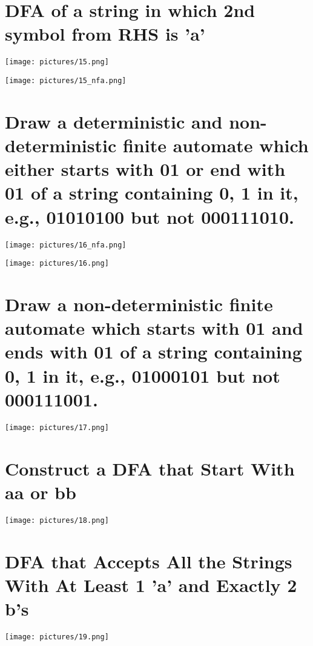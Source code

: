 \documentclass[8pt]{article}
\begin{document}
\section{DFA of a string in which 2nd symbol from RHS is 'a'}
\begin{center}
    \texttt{[image: pictures/15.png]} %
\end{center}
\begin{center}
    \texttt{[image: pictures/15\_nfa.png]} %
\end{center}
\section{Draw a deterministic and non-deterministic finite automate which either starts with 01 or end with 01 of a string containing 0, 1 in it, e.g., 01010100 but not 000111010. }
\begin{center}
    \texttt{[image: pictures/16\_nfa.png]} %
\end{center}
\begin{center}
    \texttt{[image: pictures/16.png]} %
\end{center}
\section{ Draw a non-deterministic finite automate which starts with 01 and ends with 01 of a string containing 0, 1 in it, e.g., 01000101 but not 000111001.}
\begin{center}
    \texttt{[image: pictures/17.png]} %
\end{center}
\section{Construct a DFA that Start With aa or bb}
\begin{center}
    \texttt{[image: pictures/18.png]} %
\end{center}
\section{DFA that Accepts All the Strings With At Least 1 'a' and Exactly 2 b's}
\begin{center}
    \texttt{[image: pictures/19.png]} %
\end{center}
\end{document}
